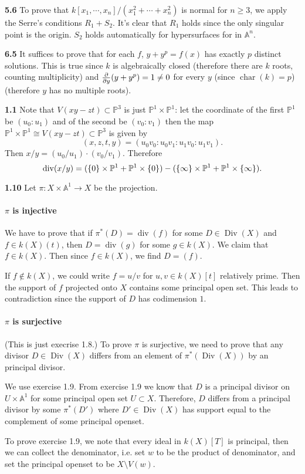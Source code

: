 \documentclass{article}
\makeatletter
\newcommand*{\shifttext}[1]{%
  \settowidth{\@tempdima}{#1}%
  \hspace{-\@tempdima}#1%
}
\newcommand{\plabel}[1]{%
\shifttext{\textbf{#1}\quad}%
}
\newcommand{\prule}{%
\begin{center}%
\hdashrule[0.5ex]{.99\linewidth}{1pt}{1pt 2.5pt}%
\end{center}%
}
\makeatother
\begin{document}
\plabel{5.6}%
To prove that $k[x_1,\cdots,x_n]/(x_1^2+\cdots+x_n^2)$ is normal for $n\ge 3$, we apply the Serre's conditions $R_1+S_2$.
It's clear that $R_1$ holds since the only singular point is the origin.
$S_2$ holds automatically for hypersurfaces for in $\mathbb{A}^n$.


\prule

\plabel{6.5}%
It suffices to prove that for each $f$, $y + y^p = f(x)$ has exactly $p$ distinct solutions.
This is true since $k$ is algebraically closed (therefore there are $k$ roots, counting multiplicity) and $\pdv{y}\qty(y+y^p) = 1\neq 0$ for every $y$ (since $\operatorname{char}(k) = p$) (therefore $y$ has no multiple roots).

\prule

\plabel{1.1}%
Note that $V(xy-zt)\subset \mathbb{P}^3$ is just $\mathbb{P}^1\times \mathbb{P}^1$:
let the coordinate of the first $\mathbb{P}^1$ be $(u_0:u_1)$ and of the second be $(v_0:v_1)$ then the map $\mathbb{P}^1\times \mathbb{P}^1 \cong V(xy-zt)\subset \mathbb{P}^3$ is given by
\[ (x,z,t,y) = (u_0v_0:u_0v_1:u_1v_0:u_1v_1). \]
Then $x/y = (u_0/u_1) \cdot (v_0/v_1)$.
Therefore
\[ \operatorname{div}(x/y) = (\qty{0}\times \mathbb{P}^1 + \mathbb{P}^1\times \qty{0}) - (\qty{\infty}\times \mathbb{P}^1 + \mathbb{P}^1\times \qty{\infty}). \]

\plabel{1.10}%
Let $\pi\colon X\times \mathbb{A}^1 \to X$ be the projection.
\paragraph*{$\pi$ is injective}%
We have to prove that if $\pi^*(D) = \operatorname{div}(f)$ for some $D\in \operatorname{Div}(X)$ and $f\in k(X)(t)$, then $D = \operatorname{div}(g)$ for some $g\in k(X)$.
We claim that $f\in k(X)$. Then since $f\in k(X)$, we find $D = (f)$.
\par
If $f\notin k(X)$, we could write $f = u/v$ for $u,v\in k(X)[t]$ relatively prime.
Then the support of $f$ projected onto $X$ contains some principal open set.
This leads to contradiction since the support of $D$ has codimension $1$.
\paragraph*{$\pi$ is surjective}%
(This is just execrise 1.8.)
To prove $\pi$ is surjective, we need to prove that any divisor $D\in \operatorname{Div}(X)$ differs from an element of $\pi^*(\operatorname{Div}(X))$ by an principal divisor.
\par
We use exercise 1.9.
From exercise 1.9 we know that $D$ is a principal divisor on $U\times \mathbb{A}^1$ for some principal open set $U\subset X$.
Therefore, $D$ differs from a principal divisor by some $\pi^*(D')$ where $D'\in \operatorname{Div}(X)$ has support equal to the complement of some principal openset.
\par
To prove exercise 1.9, we note that every ideal in $k(X)[T]$ is principal, then we can collect the denominator, i.e. set $w$ to be the product of denominator, and set the principal openset to be $X\setminus V(w)$.
\end{document}
